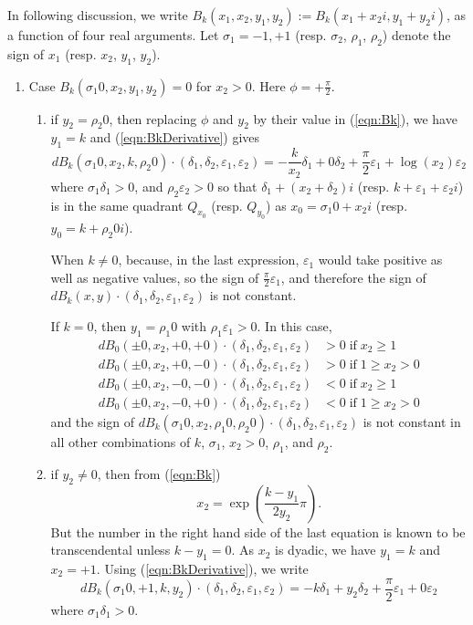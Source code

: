 \documentclass [11pt]{article}
\renewcommand {\epsilon}{\varepsilon}
\renewcommand {\geq}{\geqslant}
\begin{document}
In following discussion, we write
$B_k(x_1, x_2, y_1, y_2) := B_k(x_1+x_2i, y_1+y_2i)$,
as a function of four real arguments.
Let $\sigma_1 = -1,+1$ (resp. $\sigma_2$, $\rho_1$, $\rho_2$) denote the sign
of $x_1$ (resp. $x_2$, $y_1$, $y_2$).
\begin {enumerate}
\item Case $B_k(\sigma_1 0, x_2, y_1, y_2)=0$ for $x_2 > 0$.
  Here $\phi = +\frac{\pi}{2}$.
  \begin {enumerate}
  \item if $y_2=\rho_2 0$, then replacing $\phi$ and $y_2$ by their value in
    (\ref{eqn:Bk}), we have $y_1= k$ and (\ref{eqn:BkDerivative}) gives
    \[
    dB_k(\sigma_1 0, x_2, k, \rho_2 0)\cdot(\delta_1, \delta_2, \epsilon_1,
    \epsilon_2) = - \frac{k}{x_2} \delta_1 + 0 \delta_2 + \frac{\pi}{2}
    \epsilon_1 + \log(x_2) \epsilon_2
    \]
    where $\sigma_1 \delta_1 > 0$, and $\rho_2 \epsilon_2 > 0$ so that
    $\delta_1 + (x_2 + \delta_2)i$ (resp. $k+\epsilon_1 + \epsilon_2 i$) is in
    the same quadrant $Q_{x_0}$ (resp.  $Q_{y_0}$) as $x_0=\sigma_1 0 +x_2 i$
    (resp. $y_0=k +\rho_2 0i$).

    When $k \neq 0$, because, in the last expression,
    $\epsilon_1$ would take positive as well as negative values,
    so the sign of $\frac{\pi}{2} \epsilon_1$, and therefore the sign of
    $dB_k(x, y)\cdot (\delta_1, \delta_2, \epsilon_1, \epsilon_2)$ is not
    constant.

    If $k=0$, then $y_1=\rho_1 0$ with $\rho_1 \epsilon_1 > 0$.
    In this case,
    \begin {align*}
      dB_0(\pm 0, x_2, +0, +0)\cdot(\delta_1, \delta_2, \epsilon_1,
      \epsilon_2) &> 0 \;\text{if}\; x_2 \geq 1 \\
      dB_0(\pm 0, x_2, +0, -0)\cdot(\delta_1, \delta_2, \epsilon_1,
      \epsilon_2) &> 0 \;\text{if}\; 1 \geq x_2 > 0 \\
      dB_0(\pm 0, x_2, -0, -0)\cdot(\delta_1, \delta_2, \epsilon_1,
      \epsilon_2) &< 0 \;\text{if}\;  x_2 \geq 1 \\
      dB_0(\pm 0, x_2, -0, +0)\cdot(\delta_1, \delta_2, \epsilon_1,
      \epsilon_2) &< 0 \;\text{if}\; 1 \geq x_2 > 0
    \end {align*}
    and the sign of $dB_k(\sigma_1 0, x_2, \rho_1 0, \rho_2 0)\cdot(\delta_1,
    \delta_2, \epsilon_1, \epsilon_2)$ is not constant in all other
    combinations of $k$, $\sigma_1$, $x_2>0$, $\rho_1$, and $\rho_2$.

  \item if $y_2\neq 0$, then from (\ref{eqn:Bk})
    \[
    x_2 = \exp\left(\frac{k-y_1}{2y_2}\pi\right).
    \]
    But the number in the right hand side of the last equation is
    known to be transcendental unless $k-y_1=0$.
    As $x_2$ is dyadic, we have $y_1= k$ and $x_2=+1$.
    Using (\ref{eqn:BkDerivative}), we write
    \[
    dB_k(\sigma_1 0, +1, k, y_2)\cdot(\delta_1, \delta_2, \epsilon_1,
    \epsilon_2) = - k \delta_1 + y_2 \delta_2 + \frac{\pi}{2} \epsilon_1 + 0
    \epsilon_2
    \]
    where $\sigma_1 \delta_1 > 0$.


\end{enumerate}
\end{enumerate}
\end{document}
